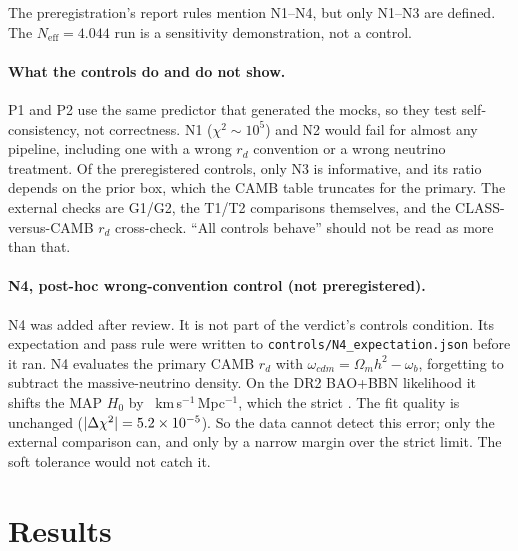 \documentclass[11pt]{article}
\begin{document}
The preregistration's report rules mention N1--N4, but only N1--N3 are
defined. The $N_\mathrm{eff}=4.044$ run is a sensitivity demonstration, not
a control.

\paragraph{What the controls do and do not show.}
P1 and P2 use the same predictor that generated the mocks, so they test
self-consistency, not correctness. N1 ($\chi^2\sim10^5$) and N2 would fail
for almost any pipeline, including one with a wrong $r_d$ convention or a
wrong neutrino treatment. Of the preregistered controls, only N3 is
informative, and its ratio depends on the prior box, which the CAMB table
truncates for the primary. The external checks are G1/G2, the T1/T2
comparisons themselves, and the CLASS-versus-CAMB $r_d$ cross-check.
``All controls behave'' should not be read as more than that.

\paragraph{N4, post-hoc wrong-convention control (not preregistered).}
N4 was added after review. It is not part of the verdict's controls
condition. Its expectation and pass rule were written to
\texttt{controls/N4\_expectation.json} before it ran. N4 evaluates the
primary CAMB $r_d$ with $\omega_{cdm}=\Omega_m h^2-\omega_b$, forgetting to
subtract the massive-neutrino density. On the DR2 BAO+BBN likelihood it
shifts the MAP $H_0$ by \NFourShift~km\,s$^{-1}$\,Mpc$^{-1}$, which
\NFourCaught{} the strict \TolStrict. The fit quality is unchanged
($|\Delta\chi^2|=5.2\times10^{-5}$). So the data cannot detect this error; only
the external comparison can, and only by a narrow margin over the strict
limit. The soft tolerance would not catch it.

\section{Results}
\end{document}
